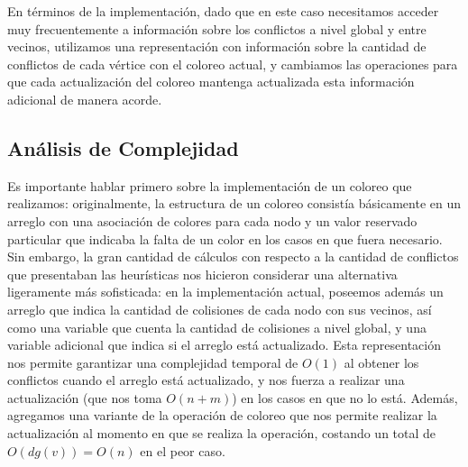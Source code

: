 \documentclass{article}
\theoremstyle{definition}
\theoremstyle{remark}
\begin{document}
En términos de la implementación, dado que en este caso necesitamos acceder muy frecuentemente a información sobre los conflictos a nivel global y entre vecinos, utilizamos una representación con información sobre la cantidad de conflictos de cada vértice con el coloreo actual, y cambiamos las operaciones para que cada actualización del coloreo mantenga actualizada esta información adicional de manera acorde.

\subsection{Análisis de Complejidad}

Es importante hablar primero sobre la implementación de un coloreo que realizamos: originalmente, la estructura de un coloreo consistía básicamente en un arreglo con una asociación de colores para cada nodo y un valor reservado particular que indicaba la falta de un color en los casos en que fuera necesario. Sin embargo, la gran cantidad de cálculos con respecto a la cantidad de conflictos que presentaban las heurísticas nos hicieron considerar una alternativa ligeramente más sofisticada: en la implementación actual, poseemos además un arreglo que indica la cantidad de colisiones de cada nodo con sus vecinos, así como una variable que cuenta la cantidad de colisiones a nivel global, y una variable adicional que indica si el arreglo está actualizado. Esta representación nos permite garantizar una complejidad temporal de $O(1)$ al obtener los conflictos cuando el arreglo está actualizado, y nos fuerza a realizar una actualización (que nos toma $O(n + m)$) en los casos en que no lo está. Además, agregamos una variante de la operación de coloreo que nos permite realizar la actualización al momento en que se realiza la operación, costando un total de $O(dg(v)) = O(n)$ en el peor caso.
\end{document}
